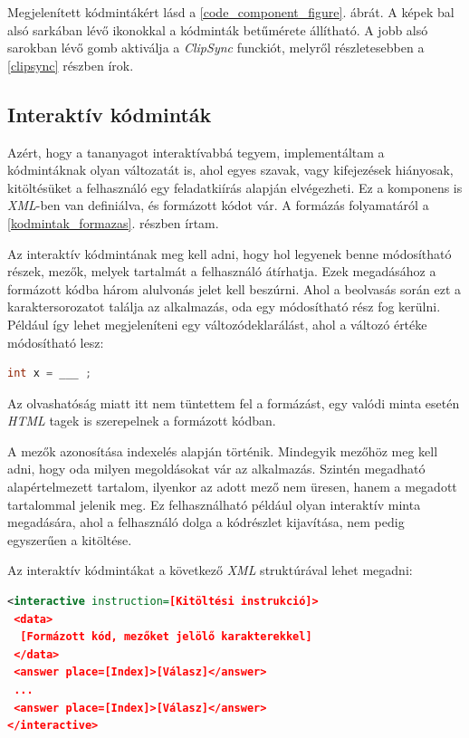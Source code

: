 \documentclass[12pt,a4paper]{article}
\newcommand{\xml}{\textit{XML}\xspace}
\begin{document}
	Megjelenített kódmintákért lásd a \ref{code_component_figure}. ábrát. A képek bal alsó sarkában lévő ikonokkal a kódminták betűmérete állítható. A jobb alsó sarokban lévő gomb aktiválja a \textit{ClipSync} funckiót, melyről részletesebben a \ref{clipsync} részben írok.
	
	\subsection{Interaktív kódminták}\label{interaktiv_kodmintak}
	
	Azért, hogy a tananyagot interaktívabbá tegyem, implementáltam a kódmintáknak olyan változatát is, ahol egyes szavak, vagy kifejezések hiányosak, kitöltésüket a felhasználó egy feladatkiírás alapján elvégezheti. Ez a komponens is \xml-ben van definiálva, és formázott kódot vár. A formázás folyamatáról a \ref{kodmintak_formazas}. részben írtam.
	
	Az interaktív kódmintának meg kell adni, hogy hol legyenek benne módosítható részek, mezők, melyek tartalmát a felhasználó átírhatja. Ezek megadásához a formázott kódba három alulvonás jelet kell beszúrni. Ahol a beolvasás során ezt a karaktersorozatot találja az alkalmazás, oda egy módosítható rész fog kerülni. Például így lehet megjeleníteni egy változódeklarálást, ahol a változó értéke módosítható lesz:
	
	\bigskip
	\begin{lstlisting}[language=Java]
int x = ___ ;
	\end{lstlisting}  
	\bigskip
	
	Az olvashatóság miatt itt nem tüntettem fel a formázást, egy valódi minta esetén \textit{HTML} tagek is szerepelnek a formázott kódban.
	
	A mezők azonosítása indexelés alapján történik. Mindegyik mezőhöz meg kell adni, hogy oda milyen megoldásokat vár az alkalmazás. Szintén megadható alapértelmezett tartalom, ilyenkor az adott mező nem üresen, hanem a megadott tartalommal jelenik meg. Ez felhasználható például olyan interaktív minta megadására, ahol a felhasználó dolga a kódrészlet kijavítása, nem pedig egyszerűen a kitöltése.
	
	Az interaktív kódmintákat a következő \xml struktúrával lehet megadni:
	
	\bigskip
	\begin{lstlisting}[language=XML]
<interactive instruction=[Kitöltési instrukció]>
 <data>
  [Formázott kód, mezőket jelölő karakterekkel]
 </data>
 <answer place=[Index]>[Válasz]</answer>
 ...
 <answer place=[Index]>[Válasz]</answer>
</interactive>
	\end{lstlisting}
	\bigskip
	
\end{document}
